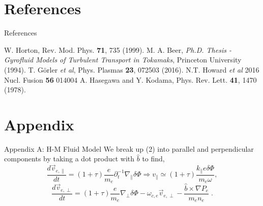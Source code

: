 \documentclass[aspectratio=43]{beamer}
\begin{document}
   \section*{References}
      \begin{frame}{References}
          \begin{thebibliography}{0}
              W. Horton, Rev. Mod. Phys. \textbf{71}, 735 (1999).
              M. A. Beer, \textit{Ph.D. Thesis - Gyrofluid Models of Turbulent Transport in Tokamaks}, Princeton University (1994).
              T. G\"{o}rler \textit{et al}, Phys. Plasmas \textbf{23}, 072503 (2016).
              N.T. Howard \textit{et al} 2016 Nucl. Fusion \textbf{56} 014004
              A. Hasegawa and Y. Kodama, Phys. Rev. Lett. \textbf{41}, 1470 (1978).
          \end{thebibliography}
      \end{frame}

   \section*{Appendix}

   \begin{frame}{Appendix A: H-M Fluid Model}
      \quad We break up (2) into parallel and perpendicular components by taking a dot product with $\hat{b}$ to find,
      \begin{equation}
         \frac{d\vec{v}_{e,\parallel}}{dt} = (1+\tau)\frac{e}{m_e}\partial_t^{-1}\nabla_{\parallel}\delta\Phi \Rightarrow v_{\parallel}
            \simeq (1+\tau)\frac{k_{\parallel}e\delta\Phi}{m_e\omega},
      \end{equation}
      \begin{equation}
         \frac{d\vec{v}_{e,\perp}}{dt} = (1+\tau)\frac{e}{m_e}\nabla_{\perp}\delta\Phi - \omega_{c,e}\vec{v}_{e,\perp}-\frac{\hat{b}\times\nabla P_e}{m_en_e}\;.
      \end{equation}
   \end{frame}
\end{document}
